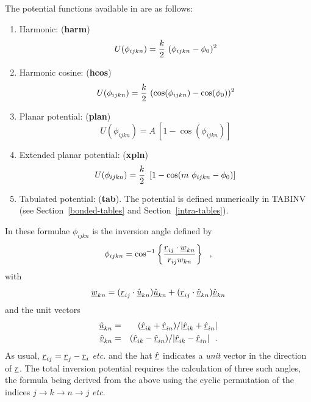 The potential functions available in \D are as follows:
\begin{enumerate}
\item Harmonic:  ({\bf harm})
\begin{equation}
U(\phi_{ijkn}) = {k \over 2}~(\phi_{ijkn} - \phi_{0})^{2}
\end{equation}
\item Harmonic cosine:  ({\bf hcos})
\begin{equation}
U(\phi_{ijkn}) = {k \over 2}~(\cos(\phi_{ijkn}) - \cos(\phi_{0}))^{2}
\end{equation}
\item Planar potential:  ({\bf plan})
\begin{equation}
U(\phi_{ijkn}) = A~\left[ 1 - \cos(\phi_{ijkn}) \right]
\end{equation}
\item Extended planar potential:  ({\bf xpln})
\begin{equation}
U(\phi_{ijkn}) = {k \over 2}~\left[ 1 - \cos(m~\phi_{ijkn} - \phi_{0}) \right]
\end{equation}
\item Tabulated potential:  ({\bf tab}).  The potential is defined numerically in TABINV (see Section~\ref{bonded-tables} and Section~\ref{intra-tables}).
\end{enumerate}
In these formulae $\phi_{ijkn}$ is the
inversion angle defined by
\begin{equation}
\phi_{ijkn}=\cos^{-1} \left\{ \frac{\mbox{$\underline{r}$}_{ij}\cdot\mbox{$\underline{w}$}_{kn}}{r_{ij}w_{kn}} \right\}~~,
\end{equation}
with
\begin{equation}
\mbox{$\underline{w}$}_{kn}=(\mbox{$\underline{r}$}_{ij}\cdot\mbox{$\underline{\hat{u}}$}_{kn})\mbox{$\underline{\hat{u}}$}_{kn}+
(\mbox{$\underline{r}$}_{ij}\cdot\mbox{$\underline{\hat{v}}$}_{kn})\mbox{$\underline{\hat{v}}$}_{kn}
\end{equation}
and the unit vectors
\begin{eqnarray}
\mbox{$\underline{\hat{u}}$}_{kn}&=&(\mbox{$\underline{\hat{r}}$}_{ik}+\mbox{$\underline{\hat{r}}$}_{in})/
|\mbox{$\underline{\hat{r}}$}_{ik}+\mbox{$\underline{\hat{r}}$}_{in}| \nonumber  \\
\mbox{$\underline{\hat{v}}$}_{kn}&=&(\mbox{$\underline{\hat{r}}$}_{ik}-\mbox{$\underline{\hat{r}}$}_{in})/
|\mbox{$\underline{\hat{r}}$}_{ik}-\mbox{$\underline{\hat{r}}$}_{in}|~~.
\end{eqnarray}
As usual, $\mbox{$\underline{r}$}_{ij}=\mbox{$\underline{r}$}_{j}-\mbox{$\underline{r}$}_{i}$ {\em etc.} and
the hat $\mbox{$\underline{\hat{r}}$}$ indicates a {\em unit} vector in the
direction of $\mbox{$\underline{r}$}$.  The total
inversion potential requires the
calculation of three such angles, the formula being derived from
the above using the cyclic permutation of the indices $j
\rightarrow k \rightarrow n \rightarrow j$ {\em etc}.

